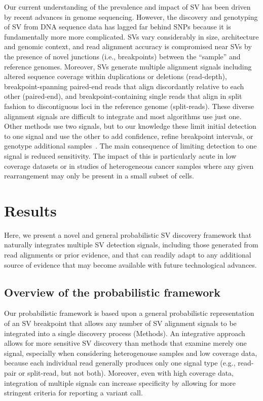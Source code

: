 \documentclass[10pt]{bmc_article}
\newenvironment{bmcformat}{\begin{raggedright}\baselineskip20pt\sloppy\setboolean{publ}{false}}{\end{raggedright}\baselineskip20pt\sloppy}
\begin{document}
\begin{bmcformat}
Our current understanding of the prevalence and impact of SV has
been driven by recent advances in genome sequencing. However, the discovery and
genotyping of SV from DNA sequence data has lagged far behind SNPs because it is
fundamentally more more complicated. SVs vary considerably in size, architecture
and genomic context, and read alignment accuracy is compromised near SVs by the
presence of novel junctions (i.e., breakpoints) between the ``sample'' and
reference genomes. Moreover, SVs generate multiple alignment signals including
altered sequence coverage within duplications or deletions (read-depth),
breakpoint-spanning paired-end reads that align discordantly relative to each
other (paired-end), and breakpoint-containing single reads that align in split
fashion to discontiguous loci in the reference genome (split-reads). These
diverse alignment signals are difficult to integrate and most algorithms use
just one. Other methods use two signals, but to our knowledge these limit
initial detection to one signal and use the other to add confidence, refine
breakpoint intervals, or genotype additional
samples~\cite{rausch2012b,sindi2012,handsaker2011}. The main consequence of
limiting detection to one signal is reduced sensitivity.  The impact of this is
particularly acute in low coverage datasets or in studies of heterogeneous
cancer samples where any given rearrangement may only be present in a small
subset of cells.

\section*{Results}
Here, we present a novel and general probabilistic SV discovery framework that
naturally integrates multiple SV detection signals, including those generated
from read alignments or prior evidence, and that can readily adapt to any
additional source of evidence that may become available with future
technological advances.

\subsection*{Overview of the probabilistic framework}

Our probabilistic framework is based upon a general probabilistic representation
of an SV breakpoint that allows any number of SV alignment signals to be
integrated into a single discovery process (Methods). An integrative approach
allows for more sensitive SV discovery than methods that examine merely one
signal, especially when considering heterogenouse samples and low coverage data,
because each individual read generally produces only one signal type (e.g.,
read-pair or split-read, but not both). Moreover, even with high coverage data,
integration of multiple signals can increase specificity by allowing for more
stringent criteria for reporting a variant call.


\end{bmcformat}
\end{document}
